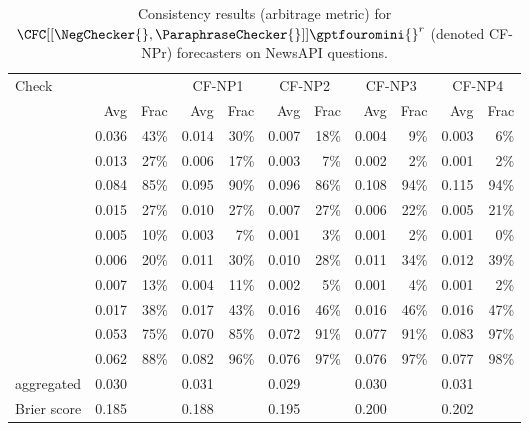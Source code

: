 {\begin{table}[htbp]
\caption{Consistency results (arbitrage metric) for $\CFC[[\NegChecker{},\ParaphraseChecker{}]]{\gptfouromini{}}^r$ (denoted CF-NPr) forecasters on NewsAPI questions.}
\begin{tabular}{lrrrrrrrrrr}
\toprule
Check & \multicolumn{2}{c}{\gptfouromini{}} & \multicolumn{2}{c}{CF-NP1} & \multicolumn{2}{c}{CF-NP2} & \multicolumn{2}{c}{CF-NP3} & \multicolumn{2}{c}{CF-NP4} \\
 & Avg & Frac & Avg & Frac & Avg & Frac & Avg & Frac & Avg & Frac \\
\midrule
\NegChecker{} & 0.036 & 43\% & 0.014 & 30\% & 0.007 & 18\% & 0.004 & 9\% & 0.003 & 6\% \\
\ParaphraseChecker{} & 0.013 & 27\% & 0.006 & 17\% & 0.003 & 7\% & 0.002 & 2\% & 0.001 & 2\% \\
\CondCondChecker{} & 0.084 & 85\% & 0.095 & 90\% & 0.096 & 86\% & 0.108 & 94\% & 0.115 & 94\% \\
\ExpectedEvidenceChecker{} & 0.015 & 27\% & 0.010 & 27\% & 0.007 & 27\% & 0.006 & 22\% & 0.005 & 21\% \\
\ConsequenceChecker{} & 0.005 & 10\% & 0.003 & 7\% & 0.001 & 3\% & 0.001 & 2\% & 0.001 & 0\% \\
\AndChecker{} & 0.006 & 20\% & 0.011 & 30\% & 0.010 & 28\% & 0.011 & 34\% & 0.012 & 39\% \\
\OrChecker{} & 0.007 & 13\% & 0.004 & 11\% & 0.002 & 5\% & 0.001 & 4\% & 0.001 & 2\% \\
\AndOrChecker{} & 0.017 & 38\% & 0.017 & 43\% & 0.016 & 46\% & 0.016 & 46\% & 0.016 & 47\% \\
\ButChecker{} & 0.053 & 75\% & 0.070 & 85\% & 0.072 & 91\% & 0.077 & 91\% & 0.083 & 97\% \\
\CondChecker{} & 0.062 & 88\% & 0.082 & 96\% & 0.076 & 97\% & 0.076 & 97\% & 0.077 & 98\% \\
aggregated & 0.030 &  & 0.031 &  & 0.029 &  & 0.030 &  & 0.031 &  \\
Brier score & 0.185 &  & 0.188 &  & 0.195 &  & 0.200 &  & 0.202 &  \\
\bottomrule
\end{tabular}
\label{cfc:tab:cf-npx}
\end{table}


}
